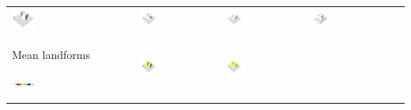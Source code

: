 \documentclass[prodmode,acmtochi]{acmsmall} %
\begin{document}
\begin{table}
{\begin{tabular}{m{} m{} m{} m{} m{}}
\includegraphics[width=0.19\textwidth]{images/render_3d/landscape_students/dem_difference_1.png} &
\includegraphics[width=0.19\textwidth]{images/render_3d/landscape_students/stdev_regression_difference_series_1.png} &
\includegraphics[width=0.19\textwidth]{images/render_3d/landscape_students/stdev_regression_difference_series_2.png} &
\includegraphics[width=0.19\textwidth]{images/render_3d/landscape_students/stdev_regression_difference_series_3.png}\\
%
Mean landforms \par \vspace{0.5em} \includegraphics[width=0.19\textwidth]{images/legends/forms_legend.pdf} & 
\includegraphics[width=0.19\textwidth]{images/render_3d/landscape_students/forms_1.png} &
\includegraphics[width=0.19\textwidth]{images/render_3d/landscape_students/mean_forms_1.png} &

\end{tabular}}
\end{table}
\end{document}
